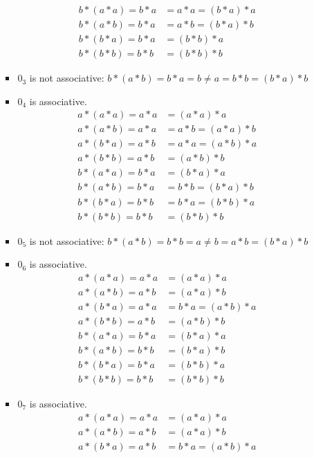 \begin{enumerate}[label={\Alph*.},font={\bfseries}]
\begin{enumerate}[label={\arabic*},font={\bfseries}]
\begin{itemize}
\begin{align*}
              b*(a*a) = b*a &= a*a = (b*a)*a \\
              b*(a*b) = b*a &= a*b = (b*a)*b \\
              b*(b*a) = b*a &= (b*b)*a \\
              b*(b*b) = b*b &= (b*b)*b
            \end{align*}
          \item $0_3$ is not associative: $b*(a*b)=b*a=b \neq a=b*b=(b*a)*b$
          \item $0_4$ is associative.
            \begin{align*}
              a*(a*a) = a*a &= (a*a)*a \\
              a*(a*b) = a*a &= a*b = (a*a)*b \\
              a*(b*a) = a*b &= a*a = (a*b)*a \\
              a*(b*b) = a*b &= (a*b)*b \\
              b*(a*a) = b*a &= (b*a)*a \\
              b*(a*b) = b*a &= b*b = (b*a)*b \\
              b*(b*a) = b*b &= b*a = (b*b)*a \\
              b*(b*b) = b*b &= (b*b)*b
            \end{align*}
          \item $0_5$ is not associative: $b*(a*b)=b*b=a \neq b=a*b=(b*a)*b$
          \item $0_6$ is associative.
            \begin{align*}
              a*(a*a) = a*a &= (a*a)*a\\
              a*(a*b) = a*b &= (a*a)*b\\
              a*(b*a) = a*a &= b*a = (a*b)*a \\
              a*(b*b) = a*b &= (a*b)*b \\
              b*(a*a) = b*a &= (b*a)*a \\
              b*(a*b) = b*b &= (b*a)*b \\
              b*(b*a) = b*a &= (b*b)*a \\
              b*(b*b) = b*b &= (b*b)*b
            \end{align*}
          \item $0_7$ is associative.
            \begin{align*}
              a*(a*a) = a*a &= (a*a)*a \\
              a*(a*b) = a*b &= (a*a)*b \\
              a*(b*a) = a*b &= b*a = (a*b)*a \\

\end{align*}
\end{itemize}
\end{enumerate}
\end{enumerate}

